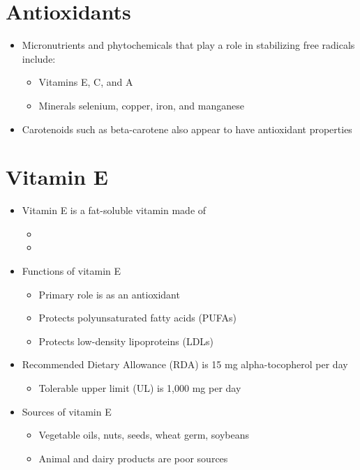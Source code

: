 \documentclass[title={Chapter 8}]{fdsn201notes}
\begin{document}
\section{Antioxidants}\label{sec:Antioxidants}
\begin{itemize}
	\item Micronutrients and phytochemicals that play a role in stabilizing free radicals include:
	\begin{itemize}
		\item Vitamins E, C, and A
		\item Minerals selenium, copper, iron, and manganese
	\end{itemize}
	\item Carotenoids such as beta-carotene also appear to have antioxidant properties
\end{itemize}

\section{Vitamin E}\label{sec:Vitamin E}
\begin{itemize}
	\item Vitamin E is a fat-soluble vitamin made of
	\begin{itemize}
		\item {}
		\item {}
	\end{itemize}
	\item Functions of vitamin E
	\begin{itemize}
		\item Primary role is as an antioxidant
		\item Protects polyunsaturated fatty acids (PUFAs)
		\item Protects low-density lipoproteins (LDLs)
	\end{itemize}
	\item Recommended Dietary Allowance (RDA) is 15 mg alpha-tocopherol per day
	\begin{itemize}
		\item Tolerable upper limit (UL) is 1,000 mg per day
	\end{itemize}
	\item Sources of vitamin E
	\begin{itemize}
		\item Vegetable oils, nuts, seeds, wheat germ, soybeans
		\item Animal and dairy products are poor sources
	\end{itemize}
\end{itemize}
\end{document}
